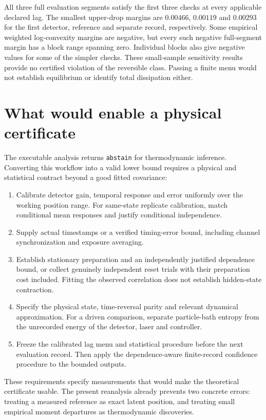 All three full evaluation segments satisfy the first three checks at every
applicable declared lag. The smallest upper-drop margins are $0.00466$,
$0.00119$ and $0.00293$ for the first detector, reference and separate record,
respectively. Some empirical weighted log-convexity margins are negative,
but every such negative full-segment margin has a block range spanning zero.
Individual blocks also give negative values for some of the simpler checks.
These small-sample sensitivity results provide no certified violation of
the reversible class. Passing a finite menu would not establish equilibrium
or identify total dissipation either.

\section{What would enable a physical certificate}

The executable analysis returns \texttt{abstain} for thermodynamic inference.
Converting this workflow into a valid lower bound requires a physical and
statistical contract beyond a good fitted covariance:
\begin{enumerate}
\item Calibrate detector gain, temporal response and error uniformly over the
      working position range. For same-state replicate calibration, match
      conditional mean responses and justify conditional independence.
\item Supply actual timestamps or a verified timing-error bound, including
      channel synchronization and exposure averaging.
\item Establish stationary preparation and an independently justified
      dependence bound, or collect genuinely independent reset trials with
      their preparation cost included. Fitting the observed correlation does
      not establish hidden-state contraction.
\item Specify the physical state, time-reversal parity and relevant dynamical
      approximation. For a driven comparison, separate particle-bath entropy
      from the unrecorded energy of the detector, laser and controller.
\item Freeze the calibrated lag menu and statistical procedure before the
      next evaluation record. Then apply the dependence-aware finite-record
      confidence procedure to the bounded outputs.
\end{enumerate}

These requirements specify measurements that would make the theoretical
certificate usable. The present reanalysis already prevents two concrete
errors: treating a measured reference as exact latent position, and treating
small empirical moment departures as thermodynamic discoveries.
